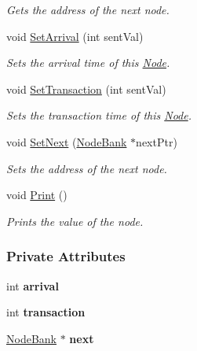 \begin{DoxyCompactItemize}
\begin{DoxyCompactList}\small\item\em Gets the address of the next node. \end{DoxyCompactList}\item 
void \hyperlink{class_node_bank_a5a1d9a5c7357980372a24bd061200f07}{Set\+Arrival} (int sent\+Val)
\begin{DoxyCompactList}\small\item\em Sets the arrival time of this \hyperlink{class_node}{Node}. \end{DoxyCompactList}\item 
void \hyperlink{class_node_bank_a34499ae655e9862cacda0c0210732d68}{Set\+Transaction} (int sent\+Val)
\begin{DoxyCompactList}\small\item\em Sets the transaction time of this \hyperlink{class_node}{Node}. \end{DoxyCompactList}\item 
void \hyperlink{class_node_bank_ac1cb1b81486331badf7d37464cf80236}{Set\+Next} (\hyperlink{class_node_bank}{Node\+Bank} $\ast$next\+Ptr)
\begin{DoxyCompactList}\small\item\em Sets the address of the next node. \end{DoxyCompactList}\item 
void \hyperlink{class_node_bank_aedf993aed2fcb8f9ce9d0ec062719022}{Print} ()
\begin{DoxyCompactList}\small\item\em Prints the value of the node. \end{DoxyCompactList}\end{DoxyCompactItemize}
\subsubsection*{Private Attributes}
\begin{DoxyCompactItemize}
\item 
int {\bfseries arrival}\hypertarget{class_node_bank_a4ce9331513f28e493f609071c99a60a4}{}\label{class_node_bank_a4ce9331513f28e493f609071c99a60a4}

\item 
int {\bfseries transaction}\hypertarget{class_node_bank_ab7b71e57a9d7a5ee8951a8d7e4d12e8a}{}\label{class_node_bank_ab7b71e57a9d7a5ee8951a8d7e4d12e8a}

\item 
\hyperlink{class_node_bank}{Node\+Bank} $\ast$ {\bfseries next}\hypertarget{class_node_bank_a6d83586fcea51dfa324ac41bfc120052}{}\label{class_node_bank_a6d83586fcea51dfa324ac41bfc120052}

\end{DoxyCompactItemize}


